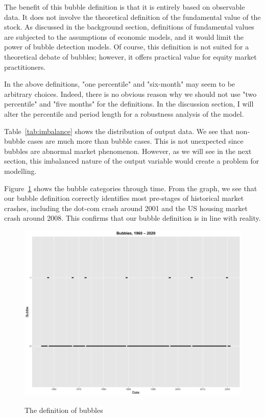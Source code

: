 \documentclass[12pt, man, a4paper, floatsintext]{apa7}
\begin{document}
The benefit of this bubble definition is that it is entirely based on observable data. It does not involve the theoretical definition of the fundamental value of the stock. As discussed in the background section, definitions of fundamental values are subjected to the assumptions of economic models, and it would limit the power of bubble detection models. Of course, this definition is not suited for a theoretical debate of bubbles; however, it offers practical value for equity market practitioners.

In the above definitions, "one percentile" and "six-month" may seem to be arbitrary choices. Indeed, there is no obvious reason why we should not use "two percentile" and "five months" for the definitions. In the discussion section, I will alter the percentile and period length for a robustness analysis of the model.

Table~\ref{tab:imbalance} shows the distribution of output data. We see that non-bubble cases are much more than bubble cases. This is not unexpected since bubbles are abnormal market phenomenon. However, as we will see in the next section, this imbalanced nature of the output variable would create a problem for modelling. 

Figure~\ref{fig:bubble_def} shows the bubble categories through time. From the graph, we see that our bubble definition correctly identifies most pre-stages of historical market crashes, including the dot-com crash around 2001 and the US housing market crash around 2008. This confirms that our bubble definition is in line with reality.




\begin{figure}
    \centering
    \caption{The definition of bubbles}
    \includegraphics[width=15cm]{bubble_def.png}
    \label{fig:bubble_def}
\end{figure}
\end{document}
